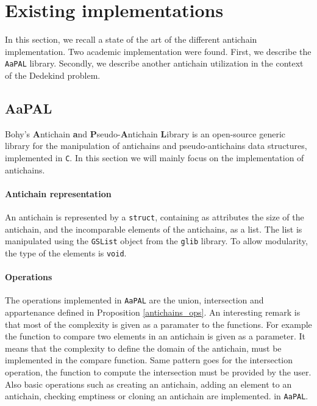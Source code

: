 \documentclass[11pt,a4paper]{article}
\theoremstyle{definition}
\begin{document}
\newpage


\section{Existing implementations}

\label{impl}

In this section, we recall a state of the art of the different
antichain implementation. Two academic implementation were found.
First, we describe the \texttt{AaPAL}
library. Secondly, we describe another antichain utilization
in the context of the Dedekind problem.

\subsection{AaPAL}

Bohy's \textbf{A}ntichain
\textbf{a}nd \textbf{P}seudo-\textbf{A}ntichain \textbf{L}ibrary \cite{aapal}
is an open-source generic library for the manipulation
of antichains and pseudo-antichains data structures,
implemented in \texttt{C}. In this section we will mainly focus
on the implementation of antichains.


\paragraph{Antichain representation}

An antichain is represented by a \texttt{struct}, containing as attributes
the size of the antichain, and the incomparable elements of the antichains,
as a list. The list is manipulated using the \texttt{GSList} object
from the \texttt{glib} library.
To allow modularity, the type of the elements
is \texttt{void}.

\paragraph{Operations}

The operations implemented in \texttt{AaPAL}
are the union, intersection and appartenance
defined in Proposition \ref{antichains_ops}.
An interesting remark is that most of the complexity is given as a paramater
to the functions. For example the function to compare two elements in
an antichain is given as a parameter. It means that the complexity to define
the domain of the antichain, must be implemented in the compare function.
Same pattern goes for the intersection operation,
the function to compute the intersection must be provided by the user.
Also basic
operations such as creating an antichain,
adding an element to
an antichain, checking emptiness or cloning an antichain are implemented.
in \texttt{AaPAL}.
\end{document}
